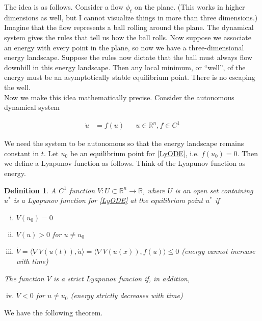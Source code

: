 \documentclass{article}
\newtheorem{definition}{Definition}[section]
\def\R{{\mathbb R}}
\begin{document}
The idea is as follows. Consider a flow $\phi_t$ on the plane. (This works in higher dimensions as well, but I cannot visualize things in more than three dimensions.) Imagine that the flow represents a ball rolling around the plane. The dynamical system gives the rules that tell us how the ball rolls. Now suppose we associate an energy with every point in the plane, so now we have a three-dimensional energy landscape. Suppose the rules now dictate that the ball must always flow downhill in this energy landscape. Then any local minimum, or ``well'', of the energy must be an asymptotically stable equilibrium point. There is no escaping the well.\\

Now we make this idea mathematically precise. Consider the autonomous dynamical system

\begin{align}\label{LyODE}
\dot{u} &= f(u) && u \in \R^n, f \in C^1
\end{align}

We need the system to be autonomous so that the energy landscape remains constant in $t$. Let $u_0$ be an equilibrium point for \eqref{LyODE}, i.e. $f(u_0) = 0$. Then we define a Lyapunov function as follows. Think of the Lyapunov function as energy.\\

\begin{definition}
A $C^1$ function $V: U \subset \R^n \rightarrow \R$, where $U$ is an open set containing $u^*$ is a \emph{Lyapunov function} for \eqref{LyODE} at the equilibrium point $u^*$ if
\begin{enumerate}[(i)]
\item $V(u_0) = 0$
\item $V(u) > 0$ for $u \neq u_0$
\item $\dot{V} = \langle \nabla V(u(t)), \dot{u} \rangle = \langle \nabla V(u(x)), f(u) \rangle \leq 0$ 
(energy cannot increase with time)
\end{enumerate}
The function $V$ is a \emph{strict Lyapunov funcion} if, in addition,
\begin{enumerate}[(i)]
\setcounter{enumi}{3}
\item $\dot{V} < 0$ for $u \neq u_0$ (energy strictly decreases with time)
\end{enumerate}
\end{definition} 

We have the following theorem.

\end{document}
